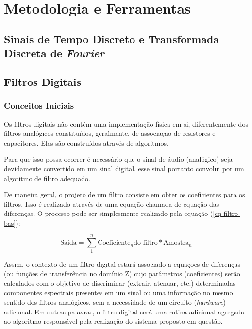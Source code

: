 \chapter{Metodologia e Ferramentas}


\section{Sinais de Tempo Discreto e Transformada Discreta de \textit{Fourier}}

\section{Filtros Digitais}

	\subsection{Conceitos Iniciais}
	
		Os filtros digitais não contém uma implementação física em si, diferentemente dos filtros analógicos constituídos, geralmente, de associação de resistores e capacitores. Eles são construídos através de algoritmos.
		
		Para que isso possa ocorrer é necessário que o sinal de áudio (analógico) seja devidamente convertido em um sinal digital. esse sinal portanto convolui por um algoritmo de filtro adequado.
		
		De maneira geral, o projeto de um filtro consiste em obter os coeficientes para os filtros. Isso é realizado através de uma equação chamada de equação das diferenças. O processo pode ser simplesmente realizado pela equação (\ref{eq-filtro-bas}):
		
		\begin{equation}
			\text{Saida} = \sum_{1}^{n} \text{Coeficiente}_n \text{do filtro} * \text{Amostra}_n
			\label{eq-filtro-bas}
		\end{equation}
		
		Assim, o contexto de um filtro digital estará associado a equações de diferenças (ou funções de transferência no domínio Z) cujo parâmetros (coeficientes) serão calculados com o objetivo de discriminar (extrair, atenuar, etc.) determinadas componentes espectrais presentes em um sinal ou uma informação no mesmo sentido dos filtros analógicos, sem a necessidade de um circuito (\textit{hardware}) adicional. Em outras palavras, o filtro digital será uma rotina adicional agregada ao algoritmo responsável pela realização do sistema proposto em questão.
		
